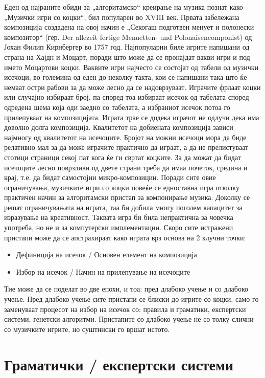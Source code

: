 Еден од најраните обиди за „алгоритамско“ креирање на музика познат како „Музички игри со коцки“, бил популарен во XVIII век. Првата забележана композиција создадена на овој начин е „Секогаш подготвен менует и полонески композитор“ (гер. Der allezeit fertige Menuetten- und Polonaisencomponist) од Јохан Филип Кирнбергер во 1757 год. Најпопуларни биле игрите напишани од страна на Хајдн и Моцарт, поради што може да се пронајдат вакви игри и под името Моцартови коцки. Ваквите игри најчесто се состојат од табели од музички исечоци, во големина од еден до неколку такта, кои се напишани така што ќе немаат остри рабови за да може лесно да се надоврзуваат. Играчите фрлаат коцки или случајно избираат број, па според тоа избираат исечок од табелата според одредена шема која оди заедно со табелата, а избраниот исечок потоа го прилепуваат на композицијата. Играта трае се додека играчот не одлучи дека има доволно долга композиција. Квалитетот на добиената композиција зависи најмногу од квалитетот на исечоците. Бројот на можни исечоци мора да биде релативно мал за да може играчите практично да играат, а да не прелистуваат стотици страници секој пат кога ќе ги свртат коцките. За да можат да бидат исечоците лесно поврзливи од двете страни треба да имаа почеток, средина и крај, т.е. да бидат самостојни микро-композиции. Поради сите овие ограничувања, музичките игри со коцки повеќе се едноставна игра отколку практичен начин за алгоритамски пристап за компонирање музика. Доколку се решат ограничувањата на играта, таа би добила многу поголем капацитет за изразување на креативност. Таквата игра би била непрактична за човечка употреба, но не и за компутерски имплементации. Скоро сите истражени пристапи може да се апстрахираат како играта врз основа на 2 клучни точки:
\begin{itemize}
    \item Дефиниција на исечок / Основен елемент на композиција 
    \item Избор на исечок / Начин на прилепување на исечоците
\end{itemize}
Тие може да се поделат во две епохи, и тоа: пред длабоко учење и со длабоко учење. Пред длабоко учење сите пристапи се блиски до игрите со коцки, само го заменуваат процесот на избор на исечок со: правила и граматики, експертски системи, генетски алгоритми. Пристапите со длабоко учење не со толку слични со музичките игрите, но суштински го вршат истото. 

\section{Граматички / експертски системи} 

